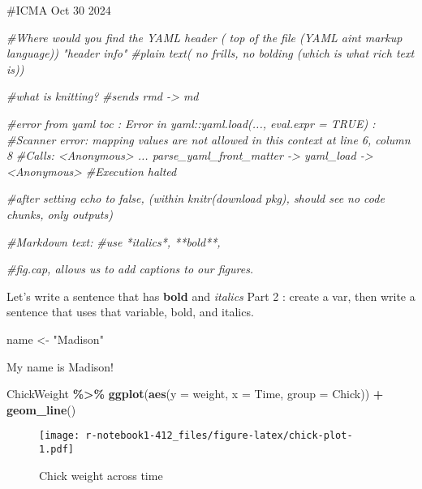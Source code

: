 \documentclass[
]{article}
\newenvironment{Shaded}{\begin{snugshade}}{\end{snugshade}}
\newcommand{\AttributeTok}[1]{\textcolor[rgb]{0.13,0.29,0.53}{#1}}
\newcommand{\CommentTok}[1]{\textcolor[rgb]{0.56,0.35,0.01}{\textit{#1}}}
\newcommand{\FunctionTok}[1]{\textcolor[rgb]{0.13,0.29,0.53}{\textbf{#1}}}
\newcommand{\NormalTok}[1]{#1}
\newcommand{\OtherTok}[1]{\textcolor[rgb]{0.56,0.35,0.01}{#1}}
\newcommand{\SpecialCharTok}[1]{\textcolor[rgb]{0.81,0.36,0.00}{\textbf{#1}}}
\newcommand{\StringTok}[1]{\textcolor[rgb]{0.31,0.60,0.02}{#1}}
\begin{document}
\#ICMA Oct 30 2024

\begin{Shaded}
\begin{Highlighting}[]
\CommentTok{\#Where would you find the YAML header ( top of the file (YAML aint markup language)) "header info" }
\CommentTok{\#plain text( no frills, no bolding (which is what rich text is))}

\CommentTok{\#what is knitting? }
\CommentTok{\#sends rmd {-}\textgreater{} md }

\CommentTok{\#error from yaml toc : Error in yaml::yaml.load(..., eval.expr = TRUE) : }
\CommentTok{\#Scanner error: mapping values are not allowed in this context at line 6, column 8}
\CommentTok{\#Calls: \textless{}Anonymous\textgreater{} ... parse\_yaml\_front\_matter {-}\textgreater{} yaml\_load {-}\textgreater{} \textless{}Anonymous\textgreater{}}
\CommentTok{\#Execution halted}

\CommentTok{\#after setting echo to false, (within knitr(download pkg), should see no code chunks, only outputs)}

\CommentTok{\#Markdown text: }
\CommentTok{\#use *italics*, **bold**, }

\CommentTok{\#fig.cap, allows us to add captions to our figures. }
\end{Highlighting}
\end{Shaded}

Let's write a sentence that has \textbf{bold} and \emph{italics} Part 2
: create a var, then write a sentence that uses that variable, bold, and
italics.

\begin{Shaded}
\begin{Highlighting}[]
\NormalTok{name }\OtherTok{\textless{}{-}}  \StringTok{"Madison"}
\end{Highlighting}
\end{Shaded}

My name is Madison!

\begin{Shaded}
\begin{Highlighting}[]
\NormalTok{ChickWeight }\SpecialCharTok{\%\textgreater{}\%}
  \FunctionTok{ggplot}\NormalTok{(}\FunctionTok{aes}\NormalTok{(}\AttributeTok{y =}\NormalTok{ weight, }\AttributeTok{x =}\NormalTok{ Time, }\AttributeTok{group =}\NormalTok{ Chick)) }\SpecialCharTok{+} 
  \FunctionTok{geom\_line}\NormalTok{()}
\end{Highlighting}
\end{Shaded}

\begin{figure}
\centering
\texttt{[image: r-notebook1-412\_files/figure-latex/chick-plot-1.pdf]}
\caption{Chick weight across time}
\end{figure}
\end{document}
